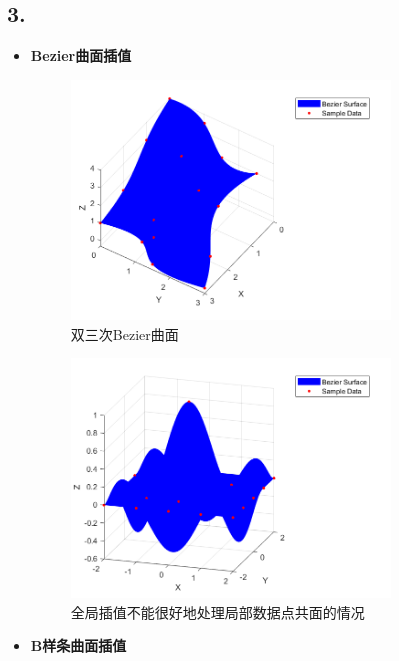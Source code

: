 \documentclass[utf8]{ctexart}
\begin{document}
\subsection*{3.}
\begin{itemize}
    \item \textbf{Bezier曲面插值}\\
    \begin{figure}[H]
        \centering
        \includegraphics[width=0.8\textwidth]{bezierSurfInterp.png}
        \caption{双三次Bezier曲面}
        \label{fig: bezierSurfInterp}
    \end{figure}
    \begin{figure}[H]
        \centering
        \includegraphics[width=0.8\textwidth]{bezierSurfInterp2.png}
        \caption{全局插值不能很好地处理局部数据点共面的情况}
        \label{fig: bezierSurfInterp2}
    \end{figure}
    \item \textbf{B样条曲面插值}\\
    \begin{figure}[H]

\end{figure}
\end{itemize}
\end{document}
